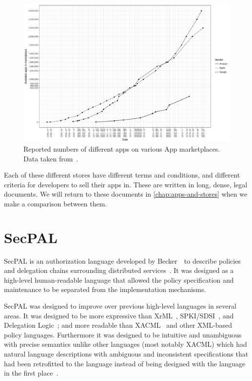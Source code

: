 \documentclass[thesis.tex]{subfiles}
\begin{document}
\begin{figure}
  \includegraphics[width=\textwidth]{figures/app-store-apps.pdf}
  \caption[Reported numbers of different apps on various App marketplaces.]{%
    Reported numbers of different apps on various App marketplaces. Data taken from~\cite{statista_google_nodate,statista_apple_nodate,statista_amazon_nodate}.}
  \label{fig:app-store-apps}
\end{figure}

Each of these different stores have different terms and conditions,
and different criteria for developers to sell their apps in.  These
are written in long, dense, legal documents. We will return to these
documents in \autoref{chap:apps-and-stores} when we make a
comparison between them.


\section{SecPAL}

SecPAL is an authorization language developed by Becker~\etal~to
describe policies and delegation chains surrounding distributed
services~\cite{becker_secpal:_2010}. It was designed as a high-level
human-readable language that allowed the policy specification and
maintenance to be separated from the implementation mechanisms.

SecPAL was designed to improve over previous high-level languages in
several areas.  It was designed to be more expressive than
XrML~\cite{kolovski_logic-based_2007},
SPKI/SDSI~\cite{ellison_spki_1999}, and Delegation
Logic~\cite{li_delegation_2003}; and more readable than
XACML~\cite{oasis_extensible_2013} and other XML-based policy
languages.  Furthermore it was designed to be intuitive and
unambiguous with precise semantics unlike other languages (most notably
XACML) which had natural language descriptions with ambiguous and
inconsistent specifications that had been retrofitted to the language
instead of being designed with the language in the first
place~\cite{bryans_reasoning_2005,ramli_logic_2014,masi_formalisation_2012}.
\end{document}
